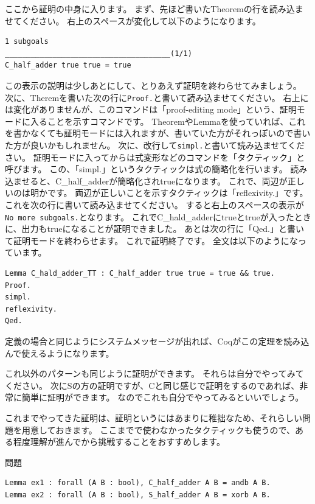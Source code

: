 \documentclass{jsbook}
\begin{document}
ここから証明の中身に入ります。
まず、先ほど書いたTheoremの行を読み込ませてください。
右上のスペースが変化して以下のようになります。
\begin{verbatim}
1 subgoals
______________________________________(1/1)
C_half_adder true true = true
\end{verbatim}
この表示の説明は少しあとにして、とりあえず証明を終わらせてみましょう。
次に、Theremを書いた次の行に\verb|Proof.|と書いて読み込ませてください。
右上には変化がありませんが、このコマンドは「proof-editing mode」という、証明モードに入ることを示すコマンドです。
TheoremやLemmaを使っていれば、これを書かなくても証明モードには入れますが、書いていた方がそれっぽいので書いた方が良いかもしれません。
次に、改行して\verb|simpl.|と書いて読み込ませてください。
証明モードに入ってからは式変形などのコマンドを「タクティック」と呼びます。
この、「simpl.」というタクティックは式の簡略化を行います。
読み込ませると、C\_half\_adderが簡略化されtrueになります。
これで、両辺が正しいのは明かです。
両辺が正しいことを示すタクティックは「reflexivity.」です。
これを次の行に書いて読み込ませてください。
すると右上のスペースの表示が\verb|No more subgoals.|となります。
これでC\_hald\_adderにtrueとtrueが入ったときに、出力もtrueになることが証明できました。
あとは次の行に「Qed.」と書いて証明モードを終わらせます。
これで証明終了です。
全文は以下のようになっています。
\begin{verbatim}
Lemma C_hald_adder_TT : C_half_adder true true = true && true.
Proof.
simpl.
reflexivity.
Qed.
\end{verbatim}
定義の場合と同じようにシステムメッセージが出れば、Coqがこの定理を読み込んで使えるようになります。

これ以外のパターンも同じように証明ができます。
それらは自分でやってみてください。
次にSの方の証明ですが、Cと同じ感じで証明をするのであれば、非常に簡単に証明ができます。
なのでこれも自分でやってみるといいでしょう。

これまでやってきた証明は、証明というにはあまりに稚拙なため、それらしい問題を用意しておきます。
ここまでで使わなかったタクティックも使うので、ある程度理解が進んでから挑戦することをおすすめします。

\begin{itembox}[l]{問題}
\begin{verbatim}
Lemma ex1 : forall (A B : bool), C_half_adder A B = andb A B.
Lemma ex2 : forall (A B : bool), S_half_adder A B = xorb A B. 
\end{verbatim}
\end{itembox}
\end{document}
